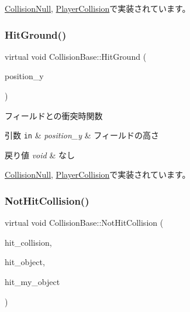 \mbox{\hyperlink{class_collision_null_a2bb1c8ca023aada97055256e033d823e}{Collision\+Null}}, \mbox{\hyperlink{class_player_collision_ad937a5fd226e742270202bf4eff53767}{Player\+Collision}}で実装されています。

\mbox{\label{class_collision_base_a48c9d1d9e4286cde5054d4d2aa70bdd8}} 
\subsubsection{\texorpdfstring{Hit\+Ground()}{HitGround()}}
{\footnotesize\ttfamily virtual void Collision\+Base\+::\+Hit\+Ground (\begin{DoxyParamCaption}\item[{float}]{position\+\_\+y }\end{DoxyParamCaption})\hspace{0.3cm}{\ttfamily [pure virtual]}}



フィールドとの衝突時関数 


\begin{DoxyParams}[1]{引数}
\mbox{\tt in}  & {\em position\+\_\+y} & フィールドの高さ \\
\hline
\end{DoxyParams}

\begin{DoxyRetVals}{戻り値}
{\em void} & なし \\
\hline
\end{DoxyRetVals}


\mbox{\hyperlink{class_collision_null_ac5645bca5f03262d1918e2ff8348440d}{Collision\+Null}}, \mbox{\hyperlink{class_player_collision_a3522ce17b1e1752f2737c2243582ecb0}{Player\+Collision}}で実装されています。

\mbox{\label{class_collision_base_a9b64fc5c3f2aac2a05296985ef799fb1}} 
\subsubsection{\texorpdfstring{Not\+Hit\+Collision()}{NotHitCollision()}}
{\footnotesize\ttfamily virtual void Collision\+Base\+::\+Not\+Hit\+Collision (\begin{DoxyParamCaption}\item[{\mbox{\hyperlink{class_collision_base}{Collision\+Base}} $\ast$}]{hit\+\_\+collision,  }\item[{\mbox{\hyperlink{class_collision_object}{Collision\+Object}} $\ast$}]{hit\+\_\+object,  }\item[{\mbox{\hyperlink{class_collision_object}{Collision\+Object}} $\ast$}]{hit\+\_\+my\+\_\+object }\end{DoxyParamCaption})\hspace{0.3cm}{\ttfamily [pure virtual]}}



